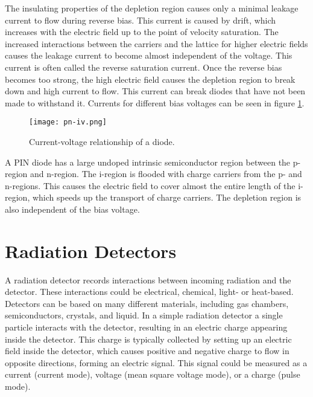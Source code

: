 \documentclass[../main/thesis.tex]{subfiles}
\begin{document}
The insulating properties of the depletion region causes only a minimal leakage current to flow during reverse bias. This current is caused by drift, which increases with the electric field up to the point of velocity saturation. The increased interactions between the carriers and the lattice for higher electric fields causes the leakage current to become almost independent of the voltage. This current is often called the reverse saturation current. Once the reverse bias becomes too strong, the high electric field causes the depletion region to break down and high current to flow. This current can break diodes that have not been made to withstand it. Currents for different bias voltages can be seen in figure \ref{fig-pn-iv}. 

\begin{figure}%
	\centering
	\texttt{[image: pn-iv.png]}
	\caption{Current-voltage relationship of a diode. \citetext{\citeauthor{SparkFun}}}
	\label{fig-pn-iv}
\end{figure}

A PIN diode has a large undoped intrinsic semiconductor region between the p-region and n-region. The i-region is flooded with charge carriers from the p- and n-regions. This causes the electric field to cover almost the entire length of the i-region, which speeds up the transport of charge carriers. The depletion region is also independent of the bias voltage. 

\section{Radiation Detectors}
\label{t-detector}
A radiation detector records interactions between incoming radiation and the detector. These interactions could be electrical, chemical, light- or heat-based. Detectors can be based on many different materials, including gas chambers, semiconductors, crystals, and liquid. In a simple radiation detector a single particle interacts with the detector, resulting in an electric charge appearing inside the detector. This charge is typically collected by setting up an electric field inside the detector, which causes positive and negative charge to flow in opposite directions, forming an electric signal. This signal could be measured as a current (current mode), voltage (mean square voltage mode), or a charge (pulse mode). \citep[chap. 4]{Knoll}
\end{document}
